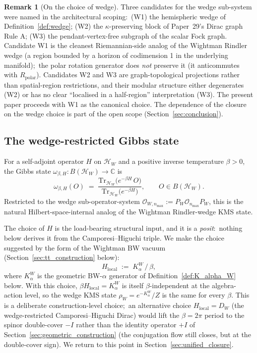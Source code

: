 \documentclass[11pt,a4paper]{article}
\theoremstyle{plain}
\theoremstyle{definition}
\newtheorem{remark}[theorem]{Remark}
\newcommand{\nmax}{n_{\max}}
\newcommand{\Hilb}{\mathcal{H}}
\newcommand{\Op}{\mathcal{O}}
\newcommand{\C}{\mathbb{C}}
\newcommand{\Tr}{\mathrm{Tr}}
\begin{document}
\begin{remark}[On the choice of wedge]\label{rem:wedge_choice}
Three candidates for the wedge sub-system were named in the architectural
scoping:\  (W1) the hemispheric wedge of Definition~\ref{def:wedge};
(W2) the $\kappa$-preserving block of Paper~29's Dirac graph Rule A;
(W3) the pendant-vertex-free subgraph of the scalar Fock graph.
Candidate W1 is the cleanest Riemannian-side analog of the Wightman
Rindler wedge (a region bounded by a horizon of codimension 1 in the
underlying manifold);\ the polar rotation generator does \emph{not}
preserve it (it anticommutes with $R_{\mathrm{polar}}$). Candidates W2 and W3 are graph-topological
projections rather than spatial-region restrictions, and their modular
structure either degenerates (W2) or has no clear ``localised in a
half-region'' interpretation (W3). The present paper proceeds with W1
as the canonical choice. The dependence of the closure on the wedge
choice is part of the open scope (Section~\ref{sec:conclusion}).
\end{remark}

\subsection{The wedge-restricted Gibbs state}\label{sec:kms_state}

For a self-adjoint operator $H$ on $\Hilb_W$ and a positive inverse
temperature $\beta > 0$, the Gibbs state
$\omega_{\beta, H}: B(\Hilb_W) \to \C$ is
\begin{equation}\label{eq:gibbs_state_def}
   \omega_{\beta, H}(O)
   \;=\; \frac{\Tr_{\Hilb_W}\bigl(e^{-\beta H}\, O\bigr)}
              {\Tr_{\Hilb_W}\bigl(e^{-\beta H}\bigr)},
   \qquad O \in B(\Hilb_W).
\end{equation}
Restricted to the wedge sub-operator-system
$\Op_{W, \nmax} := P_W \Op_{\nmax} P_W$, this is the natural
Hilbert-space-internal analog of the Wightman Rindler-wedge KMS state.

The choice of $H$ is the load-bearing structural input, and it is a
\emph{posit}:\ nothing below derives it from the Camporesi--Higuchi
triple. We make the choice suggested by the form of the Wightman BW
vacuum (Section~\ref{sec:tt_construction} below):
\begin{equation}\label{eq:H_local_def}
   H_{\mathrm{local}} \;:=\; K_\alpha^W \,/\, \beta,
\end{equation}
where $K_\alpha^W$ is the geometric BW-$\alpha$ generator of
Definition~\ref{def:K_alpha_W} below. With this choice, $\beta
H_{\mathrm{local}} = K_\alpha^W$ is itself $\beta$-independent at the
algebra-action level, so the wedge KMS state $\rho_W = e^{-K_\alpha^W}/Z$
is the same for every $\beta$. This is a deliberate construction-level
choice;\ an alternative choice $H_{\mathrm{local}} = D_W$ (the
wedge-restricted Camporesi--Higuchi Dirac) would lift the $\beta = 2\pi$
period to the spinor double-cover $-I$ rather than the identity
operator $+I$ of Section~\ref{sec:geometric_construction}
(the conjugation flow still closes, but at the double-cover sign).
We return to this point in Section~\ref{sec:unified_closure}.
\end{document}
